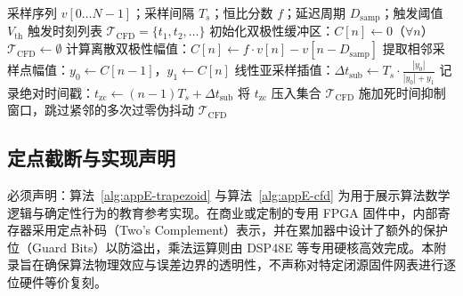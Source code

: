 \begin{algorithm}[!htbp]
\caption{数字恒比定时（CFD）与线性过零插值参考算法}\label{alg:appE-cfd}
\begin{algorithmic}[1]
\Require 采样序列 $v[0 \dots N-1]$；采样间隔 $T_s$；恒比分数 $f$；延迟周期 $D_{\mathrm{samp}}$；触发阈值 $V_{\mathrm{th}}$
\Ensure 触发时刻列表 $\mathcal{T}_{\mathrm{CFD}} = \{t_1, t_2, \dots\}$
\State 初始化双极性缓冲区：$C[n] \gets 0$（$\forall n$）
\State $\mathcal{T}_{\mathrm{CFD}} \gets \emptyset$
    \State 计算离散双极性幅值：$C[n] \gets f \cdot v[n] - v[n - D_{\mathrm{samp}}]$
     
        \State 提取相邻采样点幅值：$y_0 \gets C[n-1]$，$y_1 \gets C[n]$
        \State 线性亚采样插值：$\Delta t_{\mathrm{sub}} \gets T_s \cdot \frac{|y_0|}{|y_0| + y_1}$
        \State 记录绝对时间戳：$t_{\mathrm{zc}} \gets (n - 1) T_s + \Delta t_{\mathrm{sub}}$
        \State 将 $t_{\mathrm{zc}}$ 压入集合 $\mathcal{T}_{\mathrm{CFD}}$
        \State 施加死时间抑制窗口，跳过紧邻的多次过零伪抖动
    \EndIf
\EndFor
\State \Return $\mathcal{T}_{\mathrm{CFD}}$
\end{algorithmic}
\end{algorithm}

\subsection{定点截断与实现声明}

必须声明：算法~\ref{alg:appE-trapezoid} 与算法~\ref{alg:appE-cfd} 为用于展示算法数学逻辑与确定性行为的教育参考实现。在商业或定制的专用 FPGA 固件中，内部寄存器采用定点补码（Two's Complement）表示，并在累加器中设计了额外的保护位（Guard Bits）以防溢出，乘法运算则由 DSP48E 等专用硬核高效完成。本附录旨在确保算法物理效应与误差边界的透明性，不声称对特定闭源固件网表进行逐位硬件等价复刻。
